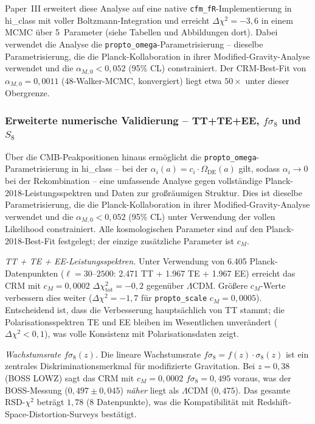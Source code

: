 \documentclass[aps,prd,twocolumn,superscriptaddress,nofootinbib,floatfix]{revtex4-2}
\begin{document}
Paper~III \cite{Geiger2026c} erweitert diese Analyse auf eine native \texttt{cfm\_fR}-Implementierung in hi\_class mit voller Boltzmann-Integration und erreicht $\Delta\chi^2 = -3{,}6$ in einem MCMC über 5~Parameter (siehe Tabellen und Abbildungen dort). Dabei verwendet die Analyse die \texttt{propto\_omega}-Parametrisierung -- dieselbe Parametrisierung, die die Planck-Kollaboration in ihrer Modified-Gravity-Analyse verwendet \cite{PlanckMG2016} und die $\alpha_{M,0} < 0{,}052$ (95\% CL) constrainiert. Der CRM-Best-Fit von $\alpha_{M,0} = 0{,}0011$ (48-Walker-MCMC, konvergiert) liegt etwa $50\times$ unter dieser Obergrenze.

\subsubsection{Erweiterte numerische Validierung -- TT+TE+EE, \texorpdfstring{$f\sigma_8$}{f sigma\_8} und \texorpdfstring{$S_8$}{S\_8}}
\label{subsubsec:extended_validation}

Über die CMB-Peakpositionen hinaus ermöglicht die \texttt{propto\_omega}-Parametrisierung in hi\_class \cite{Zumalacarregui2017} -- bei der $\alpha_i(a) = c_i \cdot \Omega_{\mathrm{DE}}(a)$ gilt, sodass $\alpha_i \to 0$ bei der Rekombination -- eine umfassende Analyse gegen vollständige Planck-2018-Leistungsspektren und Daten zur großräumigen Struktur. Dies ist dieselbe Parametrisierung, die die Planck-Kollaboration in ihrer Modified-Gravity-Analyse verwendet \cite{PlanckMG2016} und die $\alpha_{M,0} < 0{,}052$ (95\% CL) unter Verwendung der vollen Likelihood constrainiert. Alle kosmologischen Parameter sind auf den Planck-2018-Best-Fit festgelegt; der einzige zusätzliche Parameter ist $c_M$.

\textit{TT + TE + EE-Leistungsspektren.} Unter Verwendung von 6.405 Planck-Datenpunkten ($\ell = 30$--$2500$: 2.471 TT + 1.967 TE + 1.967 EE) erreicht das CRM mit $c_M = 0{,}0002$ $\Delta\chi^2_{\mathrm{tot}} = -0{,}2$ gegenüber $\Lambda$CDM. Größere $c_M$-Werte verbessern dies weiter ($\Delta\chi^2 = -1{,}7$ für \texttt{propto\_scale} $c_M = 0{,}0005$). Entscheidend ist, dass die Verbesserung hauptsächlich von TT stammt; die Polarisationsspektren TE und EE bleiben im Wesentlichen unverändert ($\Delta\chi^2 < 0{,}1$), was volle Konsistenz mit Polarisationsdaten zeigt.

\textit{Wachstumsrate $f\sigma_8(z)$.} Die lineare Wachstumsrate $f\sigma_8 = f(z) \cdot \sigma_8(z)$ ist ein zentrales Diskriminationsmerkmal für modifizierte Gravitation. Bei $z = 0{,}38$ (BOSS LOWZ) sagt das CRM mit $c_M = 0{,}0002$ $f\sigma_8 = 0{,}495$ voraus, was der BOSS-Messung ($0{,}497 \pm 0{,}045$) \textit{näher} liegt als $\Lambda$CDM ($0{,}475$). Das gesamte RSD-$\chi^2$ beträgt $1{,}78$ (8 Datenpunkte), was die Kompatibilität mit Redshift-Space-Distortion-Surveys bestätigt.
\end{document}
